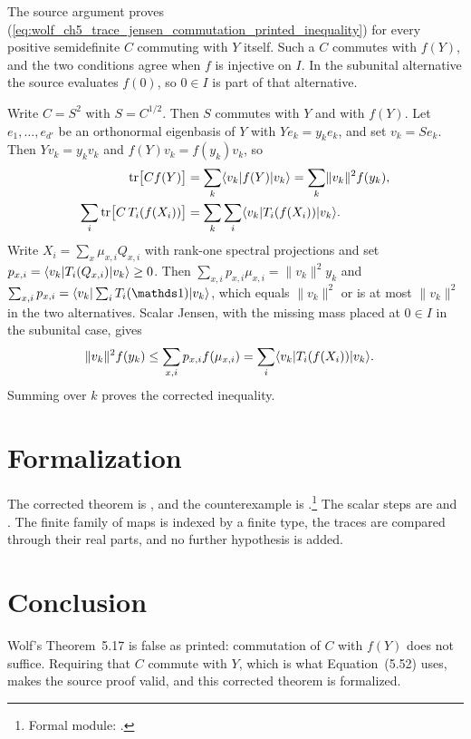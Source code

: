 \documentclass{article}
\begin{document}
The source argument proves
(\ref{eq:wolf_ch5_trace_jensen_commutation_printed_inequality}) for every
positive semidefinite $C$ commuting with $Y$ itself. Such a $C$ commutes with
$f(Y)$, and the two conditions agree when $f$ is injective on $I$. In the
subunital alternative the source evaluates $f(0)$, so $0\in I$ is part of
that alternative.

Write $C=S^2$ with $S=C^{1/2}$. Then $S$ commutes with $Y$ and with $f(Y)$.
Let $e_1,\ldots,e_{d'}$ be an orthonormal eigenbasis of $Y$ with
$Ye_k=y_ke_k$, and set $v_k=Se_k$. Then $Yv_k=y_kv_k$ and
$f(Y)v_k=f(y_k)v_k$, so
\begin{align}
    \operatorname{tr}\bigl[Cf(Y)\bigr]
        &=\sum_k\langle v_k|f(Y)|v_k\rangle
        =\sum_k\lVert v_k\rVert^2f(y_k),
    \label{eq:wolf_ch5_trace_jensen_commutation_left_side}\\
    \sum_i\operatorname{tr}\bigl[C\,T_i(f(X_i))\bigr]
        &=\sum_k\sum_i\langle v_k|T_i(f(X_i))|v_k\rangle.
    \label{eq:wolf_ch5_trace_jensen_commutation_right_side}
\end{align}
Write $X_i=\sum_x\mu_{x,i}Q_{x,i}$ with rank-one spectral projections and set
$p_{x,i}=\langle v_k|T_i(Q_{x,i})|v_k\rangle\geq0$. Then
$\sum_{x,i}p_{x,i}\mu_{x,i}=\lVert v_k\rVert^2y_k$ and
$\sum_{x,i}p_{x,i}=\bra{v_k}\sum_iT_i(\Id)\ket{v_k}$, which equals
$\lVert v_k\rVert^2$ or is at most $\lVert v_k\rVert^2$ in the two
alternatives. Scalar Jensen, with the missing mass placed at $0\in I$ in the
subunital case, gives
\begin{align}
    \lVert v_k\rVert^2f(y_k)
        &\leq\sum_{x,i}p_{x,i}f(\mu_{x,i})
        =\sum_i\langle v_k|T_i(f(X_i))|v_k\rangle.
    \label{eq:wolf_ch5_trace_jensen_commutation_pointwise}
\end{align}
Summing over $k$ proves the corrected inequality.

\section{Formalization}

The corrected theorem is
, and the
counterexample is
.\footnote{Formal
    module: .}
The scalar steps are  and
. The finite family of maps is
indexed by a finite type, the traces are compared through their real parts,
and no further hypothesis is added.

\section{Conclusion}

Wolf's Theorem~5.17 is false as printed: commutation of $C$ with $f(Y)$ does
not suffice. Requiring that $C$ commute with $Y$, which is what
Equation~(5.52) uses, makes the source proof valid, and this corrected
theorem is formalized.



\end{document}
